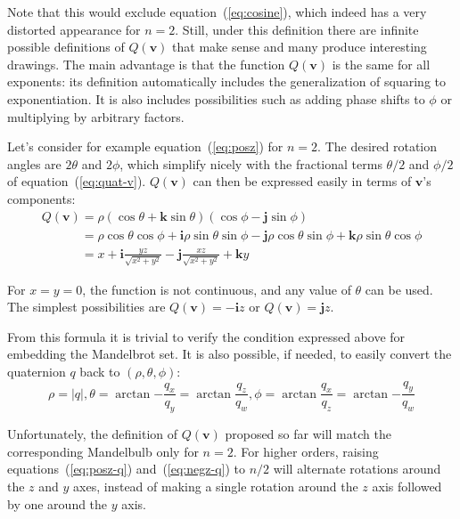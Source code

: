 \documentclass{article}
\let\vec\mathbf
\newcommand{\mathnewline}[1][\quad]{\\\phantom{#1}}
\begin{document}
Note that this would exclude equation~(\ref{eq:cosine}), which indeed
has a very distorted appearance for $n=2$.  Still, under this definition
there are infinite possible definitions of $Q(\vec{v})$ that make sense
and many produce interesting drawings.  The main advantage is that the
function $Q(\vec{v})$ is the same for all exponents: its definition
automatically includes the generalization of squaring to exponentiation.
It is also includes possibilities such as adding phase shifts to $\phi$
or multiplying by arbitrary factors.

Let's consider for example equation~(\ref{eq:posz}) for $n=2$.  The
desired rotation angles are $2\theta$ and $2\phi$, which simplify
nicely with the fractional terms $\theta/2$ and $\phi/2$ of
equation~(\ref{eq:quat-v}). $Q(\vec{v})$ can then be expressed easily
in terms of $\vec{v}$'s components:
\begin{equation}
  \label{eq:posz-q}
  \begin{array}{l}
  Q(\vec{v}) = \rho (\cos \theta + \vec{k} \sin \theta) (\cos \phi - \vec{j} \sin \phi)
  \mathnewline[Q(\vec{v})] = \rho \cos \theta \cos \phi + \vec{i} \rho \sin \theta \sin \phi - \vec{j} \rho \cos \theta \sin \phi + \vec{k} \rho \sin \theta \cos \phi
  \mathnewline[Q(\vec{v})] = x + \vec{i}\frac{y z}{\sqrt{x^2 + y^2}} - \vec{j}\frac{x z}{\sqrt{x^2 + y^2}} + \vec{k} y
\end{array}
\end{equation}

\noindent
For $x=y=0$, the function is not continuous, and any value of $\theta$
can be used.  The simplest possibilities are $Q(\vec{v}) = -\vec{i}z$
or $Q(\vec{v}) = \vec{j}z$.

From this formula it is trivial to verify the condition expressed
above for embedding the Mandelbrot set.  It is also possible, if
needed, to easily convert the quaternion $q$ back to $(\rho, \theta,
\phi)$:
\begin{equation*}
  \rho = |q|, \theta = \arctan {-\frac{q_x}{q_y}} = \arctan {\frac{q_z}{q_w}},
  \phi = \arctan {\frac{q_x}{q_z}} = \arctan {-\frac{q_y}{q_w}}
\end{equation*}

Unfortunately, the definition of $Q(\vec{v})$ proposed so far will match the
corresponding Mandelbulb only for $n=2$.  For higher orders, raising
equations~(\ref{eq:posz-q}) and~(\ref{eq:negz-q}) to $n/2$ will
alternate rotations around the $z$ and $y$ axes, instead of making a
single rotation around the $z$ axis followed by one around the $y$
axis.
\end{document}
